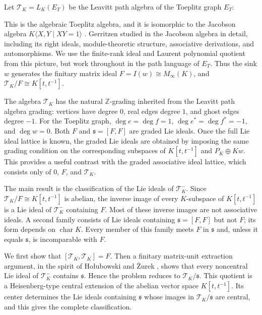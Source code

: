 \documentclass[11pt]{article}
\numberwithin{equation}{section}
\theoremstyle{plain}
\theoremstyle{definition}
\numberwithin{equation}{section}
\newcommand{\T}{\mathscr T_K}
\begin{document}
Let $\T=L_K(E_T)$ be the Leavitt path algebra of the Toeplitz graph $E_T$:
\begin{center}
	\end{center}
This is the algebraic Toeplitz algebra, and it is isomorphic to the Jacobson algebra $K\langle X,Y\mid XY=1\rangle$ \cite[Proposition~1.3.7]{AbramsAraSiles}. Gerritzen studied in \cite{Gerritzen2000} the Jacobson algebra in detail, including its right ideals, module-theoretic structure, associative derivations, and automorphisms. We use the finite-rank ideal and Laurent polynomial quotient from this picture, but work throughout in the path language of $E_T$. Thus the sink $w$ generates the finitary matrix ideal $F=I(w)\cong M_\infty(K)$, and $\T/F\cong K[t,t^{-1}]$.

The algebra $\T$ has the natural $\mathbb Z$-grading inherited from the Leavitt path algebra grading: vertices have degree $0$, real edges degree $1$, and ghost edges degree $-1$. For the Toeplitz graph, $\deg e=\deg f=1$, $\deg e^*=\deg f^*=-1$, and $\deg w=0$. Both $F$ and $\mathfrak s=[F,F]$ are graded Lie ideals. Once the full Lie ideal lattice is known, the graded Lie ideals are obtained by imposing the same grading condition on the corresponding subspaces of $K[t,t^{-1}]$ and $P_K\oplus Kw$. This provides a useful contrast with the graded associative ideal lattice, which consists only of $0$, $F$, and $\T$.

The main result is the classification of the Lie ideals of $\T^-$. Since
$\T/F\cong K[t,t^{-1}]$ is abelian, the inverse image of every
$K$-subspace of $K[t,t^{-1}]$ is a Lie ideal of $\T^-$ containing
$F$. Most of these inverse images are not associative ideals. A second
family consists of Lie ideals containing $\mathfrak s=[F,F]$ but not
$F$; its form depends on $\operatorname{char}K$. Every member of this
family meets $F$ in $\mathfrak s$ and, unless it equals $\mathfrak s$,
is incomparable with $F$.

We first show that $[\T,\T]=F$. Then a finitary matrix-unit extraction argument, in the spirit of Ho\l{}ubowski and \.{Z}urek \cite[Section~2]{HolubowskiZurek}, shows that every noncentral Lie ideal of $\T^-$ contains $\mathfrak s$. Hence the problem reduces to $\T/\mathfrak s$. This quotient is a Heisenberg-type central extension of the abelian vector space $K[t,t^{-1}]$. Its center determines the Lie ideals containing $\mathfrak s$ whose
images in $\T/\mathfrak s$ are central, and this gives the complete
classification.
\end{document}
